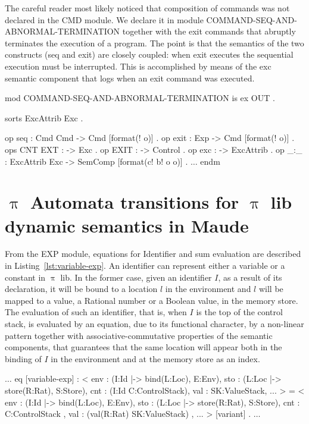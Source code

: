\documentclass[a4paper,openany]{book}
\begin{document}
The careful reader most likely noticed that composition of commands was not declared in the CMD module. We declare it in module COMMAND-SEQ-AND-ABNORMAL-TERMINATION together with the exit commands that abruptly terminates the execution of a program. The point is that the semantics of the two constructs (seq and exit) are closely coupled: when exit executes the sequential execution must be interrupted. This is accomplished by means of the exc semantic component that logs when an exit command was executed. 
\begin{maude}[caption=Signature for $\uppi$ lib abnormal termination in Maude, label=lst:uppi-lib-ab-term-sig]
mod COMMAND-SEQ-AND-ABNORMAL-TERMINATION is
    ex OUT .

    sorts ExcAttrib Exc .
    
    op seq : Cmd Cmd -> Cmd [format(! o)] .
    op exit : Exp -> Cmd [format(! o)] .
    ops CNT EXT : -> Exc .
    op EXIT : -> Control .
    op exc : -> ExcAttrib .
    op _:_ : ExcAttrib Exc -> SemComp [format(c! b! o o)] .
    $\ldots$
endm
\end{maude}

\section{$\uppi$ Automata transitions for $\uppi$ lib dynamic semantics in Maude}\label{sec:uppi-lib-gia}


From the EXP module, equations for Identifier and sum evaluation are described in Listing~\ref{lst:variable-exp}. An identifier can represent either a variable or a constant in $\uppi$ lib. In the former case, given an identifier $I$, as a result of its declaration, it will be bound to a location $l$ in the environment and $l$ will be mapped to a value, a Rational number or a Boolean value, in the memory store. The evaluation of such an identifier, that is, when $I$ is the top of the control stack, is evaluated by an equation, due to its functional character, by a non-linear pattern together with associative-commutative properties of the semantic components, that guarantees that the same location will appear both in the binding of $I$ in the environment and at the memory store as an index.
\begin{maude}[caption=$\uppi$ Automata equations for variable evaluation in Maude, label=lst:variable-exp]
    $\ldots$
    eq [variable-exp] :
        < env : (I:Id |-> bind(L:Loc), E:Env),
          sto : (L:Loc |-> store(R:Rat), S:Store),
          cnt : (I:Id C:ControlStack), val : SK:ValueStack, ... > 
     =
        < env : (I:Id |-> bind(L:Loc), E:Env),
          sto : (L:Loc |-> store(R:Rat), S:Store),
          cnt : C:ControlStack ,
          val : (val(R:Rat) SK:ValueStack) , ... > [variant] .
    $\ldots$
\end{maude}
\end{document}
